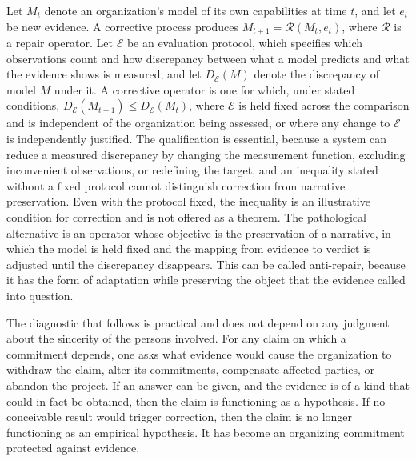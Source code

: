 \documentclass[11pt]{article}
\theoremstyle{plain}
\theoremstyle{definition}
\theoremstyle{remark}
\begin{document}
Let $M_t$ denote an organization's model of its own capabilities at time $t$, and let $e_t$ be new evidence. A corrective process produces $M_{t+1} = \mathcal{R}(M_t, e_t)$, where $\mathcal{R}$ is a repair operator. Let $\mathcal{E}$ be an evaluation protocol, which specifies which observations count and how discrepancy between what a model predicts and what the evidence shows is measured, and let $D_{\mathcal{E}}(M)$ denote the discrepancy of model $M$ under it. A corrective operator is one for which, under stated conditions, $D_{\mathcal{E}}(M_{t+1}) \le D_{\mathcal{E}}(M_t)$, where $\mathcal{E}$ is held fixed across the comparison and is independent of the organization being assessed, or where any change to $\mathcal{E}$ is independently justified. The qualification is essential, because a system can reduce a measured discrepancy by changing the measurement function, excluding inconvenient observations, or redefining the target, and an inequality stated without a fixed protocol cannot distinguish correction from narrative preservation. Even with the protocol fixed, the inequality is an illustrative condition for correction and is not offered as a theorem. The pathological alternative is an operator whose objective is the preservation of a narrative, in which the model is held fixed and the mapping from evidence to verdict is adjusted until the discrepancy disappears. This can be called anti-repair, because it has the form of adaptation while preserving the object that the evidence called into question.

The diagnostic that follows is practical and does not depend on any judgment about the sincerity of the persons involved. For any claim on which a commitment depends, one asks what evidence would cause the organization to withdraw the claim, alter its commitments, compensate affected parties, or abandon the project. If an answer can be given, and the evidence is of a kind that could in fact be obtained, then the claim is functioning as a hypothesis. If no conceivable result would trigger correction, then the claim is no longer functioning as an empirical hypothesis. It has become an organizing commitment protected against evidence.
\end{document}
